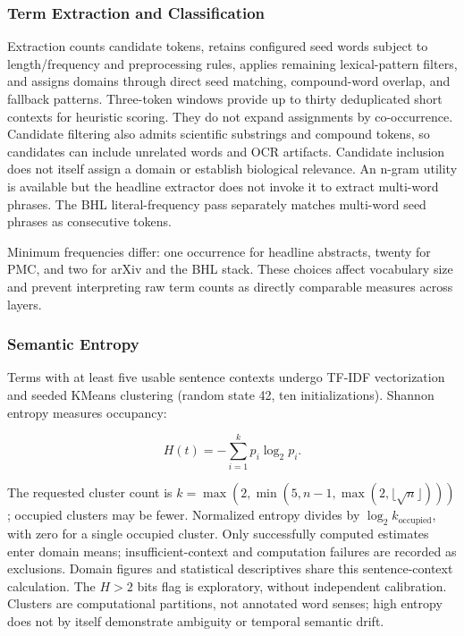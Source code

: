 \documentclass[
]{article}
\numberwithin{equation}{section}
\begin{document}
\subsubsection{Term Extraction and
Classification}\label{term-extraction-and-classification}

Extraction counts candidate tokens, retains configured seed words
subject to length/frequency and preprocessing rules, applies remaining
lexical-pattern filters, and assigns domains through direct seed
matching, compound-word overlap, and fallback patterns. Three-token
windows provide up to thirty deduplicated short contexts for heuristic
scoring. They do not expand assignments by co-occurrence. Candidate
filtering also admits scientific substrings and compound tokens, so
candidates can include unrelated words and OCR artifacts. Candidate
inclusion does not itself assign a domain or establish biological
relevance. An n-gram utility is available but the headline extractor
does not invoke it to extract multi-word phrases. The BHL
literal-frequency pass separately matches multi-word seed phrases as
consecutive tokens.

Minimum frequencies differ: one occurrence for headline abstracts,
twenty for PMC, and two for arXiv and the BHL stack. These choices
affect vocabulary size and prevent interpreting raw term counts as
directly comparable measures across layers.

\subsubsection{Semantic Entropy}\label{semantic-entropy}

Terms with at least five usable sentence contexts undergo TF-IDF
vectorization and seeded KMeans clustering (random state 42, ten
initializations). Shannon entropy measures occupancy:

\begin{equation}\label{eq:semantic_entropy}
H(t)=-\sum_{i=1}^{k}p_i\log_2p_i.
\end{equation}

The requested cluster count is
\(k=\max(2,\min(5,n-1,\max(2,\lfloor\sqrt{n}\rfloor)))\); occupied
clusters may be fewer. Normalized entropy divides by
\(\log_2 k_{\mathrm{occupied}}\), with zero for a single occupied
cluster. Only successfully computed estimates enter domain means;
insufficient-context and computation failures are recorded as
exclusions. Domain figures and statistical descriptives share this
sentence-context calculation. The \(H>2\) bits flag is exploratory,
without independent calibration. Clusters are computational partitions,
not annotated word senses; high entropy does not by itself demonstrate
ambiguity or temporal semantic drift.
\end{document}
